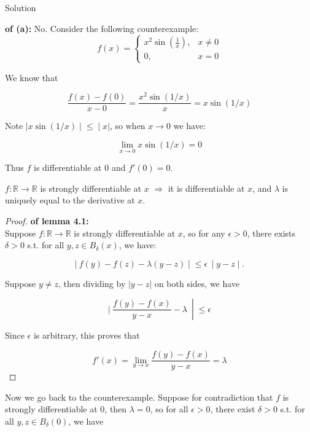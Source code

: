 \documentclass{qlnotes-export}
\begin{document}
\begin{qlsolution}{Solution}

\textbf{of (a):} No. Consider the following counterexample:\\

\[f(x) = \left\{ \begin{matrix}
{x^{2}\sin(\frac{1}{x}),} & {x \neq 0} \\
{0,} & {x = 0}
\end{matrix} \right.\]

We know that

\[\frac{f(x) - f(0)}{x - 0} = \frac{x^{2}\sin(1/x)}{x} = x\sin(1/x)\]

Note \(\left. |x\sin(1/x) \middle| \leq \middle| x| \right.\), so when \(x\rightarrow 0\) we have:

\[\lim\limits_{x\rightarrow 0}x\sin(1/x) = 0\]

Thus \(f\) is differentiable at \(0\) and \(f'(0) = 0\).

\begin{lemma}

\(f:{\mathbb{R}}\rightarrow{\mathbb{R}}\) is strongly differentiable at \(x\) \(\Longrightarrow\) it is differentiable at \(x\), and \(\lambda\) is uniquely equal to the derivative at \(x\).

\end{lemma}

\begin{proof}

\textbf{of lemma 4.1:}\\
Suppose \(f:{\mathbb{R}}\rightarrow{\mathbb{R}}\) is strongly differentiable at \(x\), so for any \(\epsilon > 0\), there exists \(\delta > 0\) s.t. for all \(y,z \in B_{\delta}(x)\), we have:

\[\left. |\ f(y) - f(z) - \lambda(y - z) \middle| \leq \epsilon\, \middle| y - z \middle| . \right.\]

Suppose \(y \neq z\), then dividing by \(|y - z|\) on both sides, we have

\[\left. |\ \frac{f(y) - f(x)}{y - x} - \lambda\  \middle| \leq \epsilon \right.\]

Since \(\epsilon\) is arbitrary, this proves that

\[f'(x) = \lim\limits_{y\rightarrow x}\frac{f(y) - f(x)}{y - x} = \lambda\]

\end{proof}

Now we go back to the counterexample. Suppose for contradiction that \(f\) is strongly differentiable at \(0\), then \(\lambda = 0\), so for all \(\epsilon > 0\), there exist \(\delta > 0\) s.t. for all \(y,z \in B_{\delta}(0)\), we have


\end{qlsolution}
\end{document}
